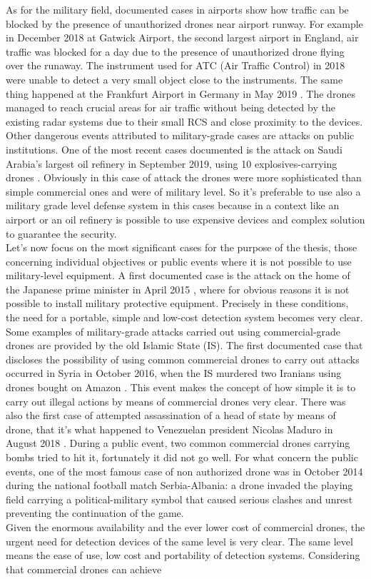 As for the military field, documented cases in airports show how traffic can be blocked by the presence of unauthorized drones near airport runway. For example in December 2018 at Gatwick Airport, the second largest airport in England, air traffic was blocked for a day due to the presence of unauthorized drone flying over the runaway. The instrument used for ATC (Air Traffic Control) in 2018 were unable to detect a very small object close to the instruments. The same thing happened at the Frankfurt Airport in Germany in May 2019 \cite{survey}. The drones managed to reach crucial areas for air traffic without being detected by the existing radar systems due to their small RCS and close proximity to the devices. Other dangerous events attributed to military-grade cases are attacks on public institutions. One of the most recent cases documented is the attack on Saudi Arabia's largest oil refinery in September 2019, using 10 explosives-carrying drones \cite{survey}. Obviously in this case of attack the drones were more sophisticated than simple commercial ones and were of military level. So it's preferable to use also a military grade level defense system in this cases because in a context like an airport or an oil refinery is possible to use expensive devices and complex solution to guarantee the security. \\ Let's now focus on the most significant cases for the purpose of the thesis, those concerning individual objectives or public events where it is not possible to use military-level equipment. A first documented case is the attack on the home of the Japanese prime minister in April 2015 \cite{survey}, where for obvious reasons it is not possible to install military protective equipment. Precisely in these conditions, the need for a portable, simple and low-cost detection system becomes very clear. Some examples of military-grade attacks carried out using commercial-grade drones are provided by the old Islamic State (IS). The first documented case that discloses the possibility of using common commercial drones to carry out attacks occurred in Syria in October 2016, when the IS murdered two Iranians using drones bought on Amazon \cite{survey}. This event makes the concept of how simple it is to carry out illegal actions by means of commercial drones very clear. There was also the first case of attempted assassination of a head of state by means of drone, that it's what happened to Venezuelan president Nicolas Maduro in August 2018 \cite{survey}. During a public event, two common commercial drones carrying bombs tried to hit it, fortunately it did not go well. For what concern the public events, one of the most famous case of non authorized drone was in October 2014 during the national football match Serbia-Albania: a drone invaded the playing field carrying a political-military symbol that caused serious clashes and unrest preventing the continuation of the game. \\ Given the enormous availability and the ever lower cost of commercial drones, the urgent need for detection devices of the same level is very clear. The same level means the ease of use, low cost and portability of detection systems. Considering that commercial drones can achieve 